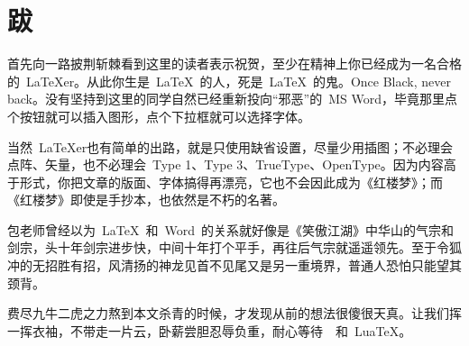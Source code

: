 \chapter{跋}

首先向一路披荆斩棘看到这里的读者表示祝贺，至少在精神上你已经成为一名合格的~\LaTeX{}er。从此你生是~\LaTeX~的人，死是~\LaTeX~的鬼。Once Black, never back。没有坚持到这里的同学自然已经重新投向“邪恶”的~MS Word，毕竟那里点个按钮就可以插入图形，点个下拉框就可以选择字体。

当然~\LaTeX{}er也有简单的出路，就是只使用缺省设置，尽量少用插图；不必理会点阵、矢量，也不必理会~Type 1、Type 3、TrueType、OpenType。因为内容高于形式，你把文章的版面、字体搞得再漂亮，它也不会因此成为《红楼梦》；而《红楼梦》即使是手抄本，也依然是不朽的名著。

包老师曾经以为~\LaTeX~和~Word~的关系就好像是《笑傲江湖》中华山的气宗和剑宗，头十年剑宗进步快，中间十年打个平手，再往后气宗就遥遥领先。至于令狐冲的无招胜有招，风清扬的神龙见首不见尾又是另一重境界，普通人恐怕只能望其颈背。

费尽九牛二虎之力熬到本文杀青的时候，才发现从前的想法很傻很天真。让我们挥一挥衣袖，不带走一片云，卧薪尝胆忍辱负重，耐心等待~\XeTeX~和~Lua\TeX。